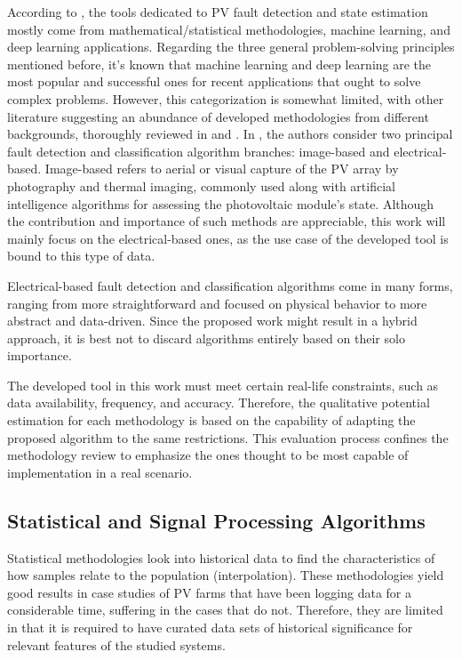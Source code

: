 According to \cite{AIPV}, the tools dedicated to PV fault detection and state estimation mostly come from mathematical/statistical methodologies, machine learning, and deep learning applications. Regarding the three general problem-solving principles mentioned before, it's known that machine learning and deep learning are the most popular and successful ones for recent applications that ought to solve complex problems. However, this categorization is somewhat limited, with other literature suggesting an abundance of developed methodologies from different backgrounds, thoroughly reviewed in \cite{Hong2022} and \cite{Livera2019}. In \cite{Hong2022}, the authors consider two principal fault detection and classification algorithm branches: image-based and electrical-based. Image-based refers to aerial or visual capture of the PV array by photography and thermal imaging, commonly used along with artificial intelligence algorithms for assessing the photovoltaic module's state. Although the contribution and importance of such methods are appreciable, this work will mainly focus on the electrical-based ones, as the use case of the developed tool is bound to this type of data.

Electrical-based fault detection and classification algorithms come in many forms, ranging from more straightforward and focused on physical behavior to more abstract and data-driven. Since the proposed work might result in a hybrid approach, it is best not to discard algorithms entirely based on their solo importance.


The developed tool in this work must meet certain real-life constraints, such as data availability, frequency, and accuracy. Therefore, the qualitative potential estimation for each methodology is based on the capability of adapting the proposed algorithm to the same restrictions. This evaluation process confines the methodology review to emphasize the ones thought to be most capable of implementation in a real scenario.


\subsection{Statistical and Signal Processing Algorithms}

Statistical methodologies look into historical data to find the characteristics of how samples relate to the population (interpolation). These methodologies yield good results in case studies of PV farms that have been logging data for a considerable time, suffering in the cases that do not. Therefore, they are limited in that it is required to have curated data sets of historical significance for relevant features of the studied systems.

